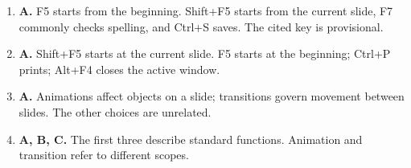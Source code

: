 \begin{enumerate}[label=\textbf{Q\arabic*.}, leftmargin=*]
\item \textbf{A.} F5 starts from the beginning. Shift+F5 starts from the current slide, F7 commonly checks spelling, and Ctrl+S saves. The cited key is provisional.

\item \textbf{A.} Shift+F5 starts at the current slide. F5 starts at the beginning; Ctrl+P prints; Alt+F4 closes the active window.

\item \textbf{A.} Animations affect objects on a slide; transitions govern movement between slides. The other choices are unrelated.

\item \textbf{A, B, C.} The first three describe standard functions. Animation and transition refer to different scopes.

\end{enumerate}
